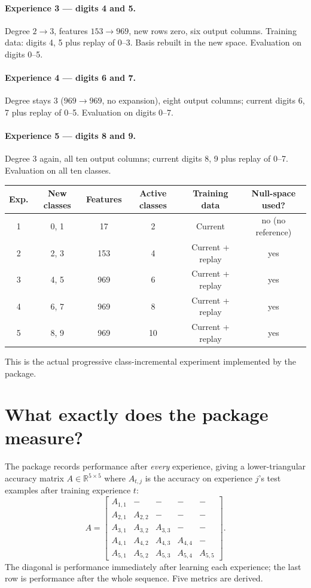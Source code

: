 \documentclass[11pt,a4paper]{article}
\newcommand{\R}{\mathbb{R}}
\begin{document}
\paragraph{Experience 3 --- digits 4 and 5.} Degree $2\to3$, features $153\to969$, new rows zero, six output columns. Training data: digits 4, 5 plus replay of 0--3. Basis rebuilt in the new space. Evaluation on digits 0--5.

\paragraph{Experience 4 --- digits 6 and 7.} Degree stays 3 ($969\to969$, no expansion), eight output columns; current digits 6, 7 plus replay of 0--5. Evaluation on digits 0--7.

\paragraph{Experience 5 --- digits 8 and 9.} Degree 3 again, all ten output columns; current digits 8, 9 plus replay of 0--7. Evaluation on all ten classes.

\begin{center}
\begin{tabular}{@{}cccccc@{}}
\toprule
Exp. & New classes & Features & Active classes & Training data & Null-space used?\\
\midrule
1 & 0, 1 & 17 & 2 & Current & no (no reference)\\
2 & 2, 3 & 153 & 4 & Current + replay & yes\\
3 & 4, 5 & 969 & 6 & Current + replay & yes\\
4 & 6, 7 & 969 & 8 & Current + replay & yes\\
5 & 8, 9 & 969 & 10 & Current + replay & yes\\
\bottomrule
\end{tabular}
\end{center}
This is the actual progressive class-incremental experiment implemented by the package.

\section{What exactly does the package measure?}

The package records performance after \emph{every} experience, giving a lower-triangular accuracy matrix $A\in\R^{5\times5}$ where $A_{t,j}$ is the accuracy on experience $j$'s test examples after training experience $t$:
\[
A=\begin{bmatrix}
A_{1,1}&-&-&-&-\\
A_{2,1}&A_{2,2}&-&-&-\\
A_{3,1}&A_{3,2}&A_{3,3}&-&-\\
A_{4,1}&A_{4,2}&A_{4,3}&A_{4,4}&-\\
A_{5,1}&A_{5,2}&A_{5,3}&A_{5,4}&A_{5,5}
\end{bmatrix}.
\]
The diagonal is performance immediately after learning each experience; the last row is performance after the whole sequence. Five metrics are derived.
\end{document}
